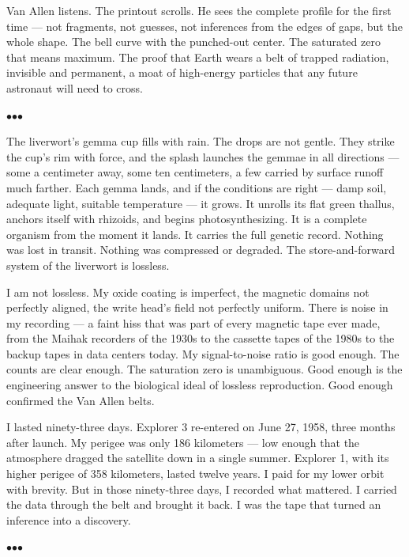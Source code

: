 \documentclass[12pt, letterpaper]{article}
\begin{document}
Van Allen listens. The printout scrolls. He sees the complete profile for the first time --- not fragments, not guesses, not inferences from the edges of gaps, but the whole shape. The bell curve with the punched-out center. The saturated zero that means maximum. The proof that Earth wears a belt of trapped radiation, invisible and permanent, a moat of high-energy particles that any future astronaut will need to cross.

\bigskip
\centerline{$\bullet$\quad$\bullet$\quad$\bullet$}
\bigskip

The liverwort's gemma cup fills with rain. The drops are not gentle. They strike the cup's rim with force, and the splash launches the gemmae in all directions --- some a centimeter away, some ten centimeters, a few carried by surface runoff much farther. Each gemma lands, and if the conditions are right --- damp soil, adequate light, suitable temperature --- it grows. It unrolls its flat green thallus, anchors itself with rhizoids, and begins photosynthesizing. It is a complete organism from the moment it lands. It carries the full genetic record. Nothing was lost in transit. Nothing was compressed or degraded. The store-and-forward system of the liverwort is lossless.

I am not lossless. My oxide coating is imperfect, the magnetic domains not perfectly aligned, the write head's field not perfectly uniform. There is noise in my recording --- a faint hiss that was part of every magnetic tape ever made, from the Maihak recorders of the 1930s to the cassette tapes of the 1980s to the backup tapes in data centers today. My signal-to-noise ratio is good enough. The counts are clear enough. The saturation zero is unambiguous. Good enough is the engineering answer to the biological ideal of lossless reproduction. Good enough confirmed the Van Allen belts.

I lasted ninety-three days. Explorer 3 re-entered on June 27, 1958, three months after launch. My perigee was only 186 kilometers --- low enough that the atmosphere dragged the satellite down in a single summer. Explorer 1, with its higher perigee of 358 kilometers, lasted twelve years. I paid for my lower orbit with brevity. But in those ninety-three days, I recorded what mattered. I carried the data through the belt and brought it back. I was the tape that turned an inference into a discovery.

\bigskip
\centerline{$\bullet$\quad$\bullet$\quad$\bullet$}
\bigskip
\end{document}

